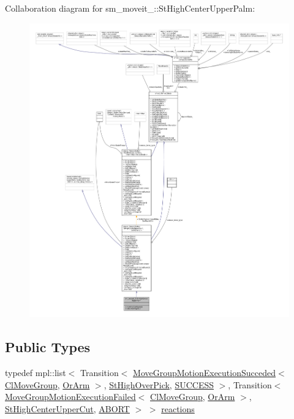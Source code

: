 Collaboration diagram for sm\+\_\+moveit\+\_\+:\+:St\+High\+Center\+Upper\+Palm\+:
\nopagebreak
\begin{figure}[H]
\begin{center}
\leavevmode
\includegraphics[width=350pt]{structsm__moveit__3_1_1StHighCenterUpperPalm__coll__graph}
\end{center}
\end{figure}
\subsection*{Public Types}
\begin{DoxyCompactItemize}
\item 
typedef mpl\+::list$<$ Transition$<$ \hyperlink{structmove__group__interface__client_1_1MoveGroupMotionExecutionSucceded}{Move\+Group\+Motion\+Execution\+Succeded}$<$ \hyperlink{classmove__group__interface__client_1_1ClMoveGroup}{Cl\+Move\+Group}, \hyperlink{classsm__moveit__3_1_1OrArm}{Or\+Arm} $>$, \hyperlink{structsm__moveit__3_1_1StHighOverPick}{St\+High\+Over\+Pick}, \hyperlink{classSUCCESS}{S\+U\+C\+C\+E\+SS} $>$, Transition$<$ \hyperlink{structmove__group__interface__client_1_1MoveGroupMotionExecutionFailed}{Move\+Group\+Motion\+Execution\+Failed}$<$ \hyperlink{classmove__group__interface__client_1_1ClMoveGroup}{Cl\+Move\+Group}, \hyperlink{classsm__moveit__3_1_1OrArm}{Or\+Arm} $>$, \hyperlink{structsm__moveit__3_1_1StHighCenterUpperCut}{St\+High\+Center\+Upper\+Cut}, \hyperlink{classABORT}{A\+B\+O\+RT} $>$ $>$ \hyperlink{structsm__moveit__3_1_1StHighCenterUpperPalm_aad95efec300751f5b6021f941c660dbe}{reactions}
\end{DoxyCompactItemize}
